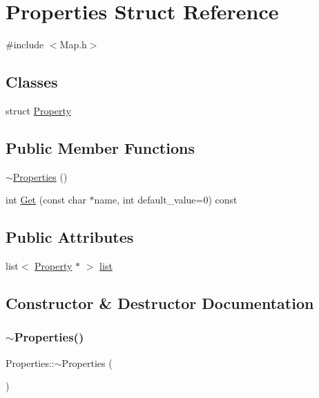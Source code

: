 \hypertarget{struct_properties}{}\section{Properties Struct Reference}
\label{struct_properties}


{\ttfamily \#include $<$Map.\+h$>$}

\subsection*{Classes}
\begin{DoxyCompactItemize}
\item 
struct \mbox{\hyperlink{struct_properties_1_1_property}{Property}}
\end{DoxyCompactItemize}
\subsection*{Public Member Functions}
\begin{DoxyCompactItemize}
\item 
\mbox{\hyperlink{struct_properties_a9a4367c64d90a962fc260128587670dd}{$\sim$\+Properties}} ()
\item 
int \mbox{\hyperlink{struct_properties_a728de312aae2d40ef5af5ac892965483}{Get}} (const char $\ast$name, int default\+\_\+value=0) const
\end{DoxyCompactItemize}
\subsection*{Public Attributes}
\begin{DoxyCompactItemize}
\item 
list$<$ \mbox{\hyperlink{struct_properties_1_1_property}{Property}} $\ast$ $>$ \mbox{\hyperlink{struct_properties_af9cad6a48a10663603d73e01cf9fb5df}{list}}
\end{DoxyCompactItemize}


\subsection{Constructor \& Destructor Documentation}
\mbox{\label{struct_properties_a9a4367c64d90a962fc260128587670dd}} 
\subsubsection{\texorpdfstring{$\sim$Properties()}{~Properties()}}
{\footnotesize\ttfamily Properties\+::$\sim$\+Properties (\begin{DoxyParamCaption}{ }\end{DoxyParamCaption})\hspace{0.3cm}{\ttfamily [inline]}}



